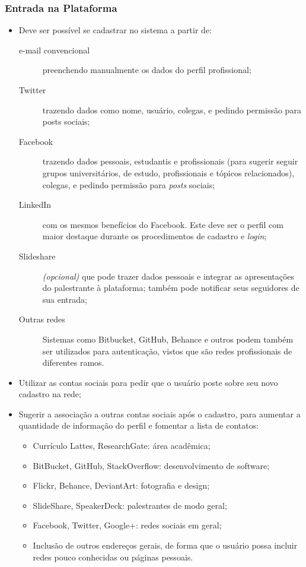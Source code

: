 \documentclass[12pt,a4paper,twoside,hyphens,english,brazil]{abntex2}
\begin{document}
\subsubsection*{Entrada na Plataforma}
\begin{itemize}
\item Deve ser possível se cadastrar no sistema a partir de:
	\begin{description} %
		\item[e-mail convencional] preenchendo manualmente os dados do perfil profissional;
		\item[Twitter] trazendo dados como nome, usuário, colegas, e pedindo permissão para posts sociais; %
		\item[Facebook] trazendo dados pessoais, estudantis e profissionais (para sugerir seguir grupos universitários, de estudo, profissionais e tópicos relacionados), colegas, e pedindo permissão para \emph{posts} sociais; %
		\item[LinkedIn] com os mesmos benefícios do Facebook. Este deve ser o perfil com maior destaque durante os procedimentos de cadastro e \emph{login};
		\item[Slideshare] \textit{(opcional)} que pode trazer dados pessoais e integrar as apresentações do palestrante à plataforma; também pode notificar seus seguidores de sua entrada;
		\item[Outras redes] Sistemas como Bitbucket, GitHub, Behance e outros podem também ser utilizados para autenticação, vistos que são redes profissionais de diferentes ramos.
	\end{description}
\item Utilizar as contas sociais para pedir que o usuário poste sobre seu novo cadastro na rede;
\item Sugerir a associação a outras contas sociais após o cadastro, para aumentar a quantidade de informação do perfil e fomentar a lista de contatos:
	\begin{itemize}[itemsep=-1ex]
		\item Currículo Lattes, ResearchGate: área acadêmica;
		\item BitBucket, GitHub, StackOverflow: desenvolvimento de software;
		\item Flickr, Behance, DeviantArt: fotografia e design;
		\item SlideShare, SpeakerDeck: palestrantes de modo geral;
		\item Facebook, Twitter, Google+: redes sociais em geral;
		\item Inclusão de outros endereços gerais, de forma que o usuário possa incluir redes pouco conhecidas ou páginas pessoais.
	\end{itemize}
\end{itemize}
\end{document}
